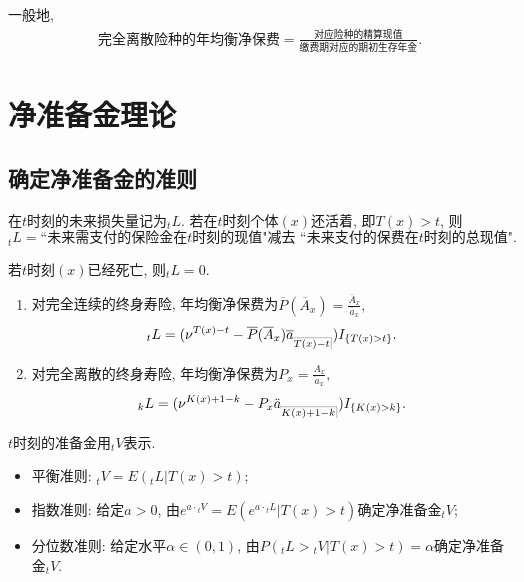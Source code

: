 \documentclass[lang=cn,10pt]{elegantbook}
\makeatletter
\DeclareRobustCommand{\annu}[1]{_{%
    \def\arraystretch{0}%
    \setlength\arraycolsep{1pt}%
    \setlength\arrayrulewidth{.2pt}%
    \begin{array}[b]{@{}c|}\hline
        \\[\arraycolsep]%
        \scriptstyle #1%
    \end{array}%
}}
\makeatother
\begin{document}
\begin{remark}
    一般地,
    \begin{align*}
        \text{完全离散险种的年均衡净保费}=\frac{\text{对应险种的精算现值}}{\text{缴费期对应的期初生存年金}}.
    \end{align*}
\end{remark}

\chapter{净准备金理论}
\section{确定净准备金的准则}
\begin{definition}[未来损失量]
    在$t$时刻的未来损失量记为$_tL$. 若在$t$时刻个体$(x)$还活着, 即$T(x)>t$, 则$${}_tL=\text{``未来需支付的保险金在$t$时刻的现值"减去 ``未来支付的保费在}t\text{时刻的总现值".}$$

    若$t$时刻$(x)$已经死亡, 则${}_tL=0.$

    \begin{enumerate}
        \item 对完全连续的终身寿险, 年均衡净保费为$\overline{P}( \overline{A}_x )=\frac{\overline A_x}{\overline a_x},$
              $${}_tL=(\nu^{T(x)-t}-\overline{P}( \overline{A}_x )\overline a_{\annu {T(x)-t}})I_{\{T(x)>t\}}.$$
        \item 对完全离散的终身寿险, 年均衡净保费为$P_x=\frac{A_x}{\ddot{a}_x},$
              $${}_kL=(\nu^{K(x)+1-k}-{P}_x \ddot{a}_{\annu {K(x)+1-k}})I_{\{K(x)>k\}}.$$
    \end{enumerate}
\end{definition}

\begin{proposition}
    $t$时刻的准备金用${}_tV$表示.
    \begin{itemize}
        \item 平衡准则: ${}_tV=E({}_tL|T(x)>t)$;
        \item 指数准则: 给定$a>0$, 由$e^{a\cdot{}_tV}=E(e^{a\cdot{}_tL}|T(x)>t)$确定净准备金${}_tV$;
        \item 分位数准则: 给定水平$\alpha\in(0,1)$, 由$P({}_tL>{}_tV|T(x)>t)=\alpha$确定净准备金${}_tV.$
    \end{itemize}
\end{proposition}
\end{document}
